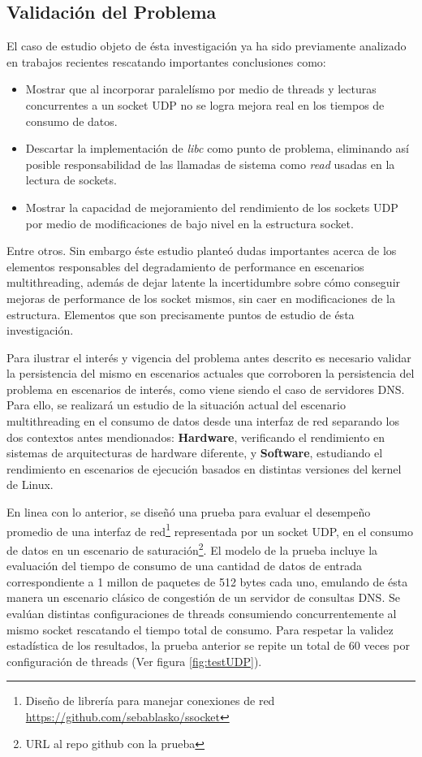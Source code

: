 \subsection{Validación del Problema}

El caso de estudio objeto de ésta investigación ya ha sido previamente analizado en trabajos recientes \cite{tesis:diegoDCC} rescatando importantes conclusiones como:
\begin{itemize}
\item Mostrar que al incorporar paralelísmo por medio de threads y lecturas concurrentes a un socket UDP no se logra mejora real en los tiempos de consumo de datos.
\item Descartar la implementación de \emph{libc} como punto de problema, eliminando así posible responsabilidad de las llamadas de sistema como \emph{read} usadas en la lectura de sockets.
\item Mostrar la capacidad de mejoramiento del rendimiento de los sockets UDP por medio de modificaciones de bajo nivel en la estructura socket.
\end{itemize}

Entre otros. Sin embargo éste estudio planteó dudas importantes acerca de los elementos responsables del degradamiento de performance en escenarios multithreading, además de dejar latente la incertidumbre sobre cómo conseguir mejoras de performance de los socket mismos, sin caer en modificaciones de la estructura. Elementos que son precisamente puntos de estudio de ésta investigación.

Para ilustrar el interés y vigencia del problema antes descrito es necesario validar la persistencia del mismo en escenarios actuales que corroboren la persistencia del problema en escenarios de interés, como viene siendo el caso de servidores DNS. Para ello, se realizará un estudio de la situación actual del escenario multithreading en el consumo de datos desde una interfaz de red separando los dos contextos antes mendionados: \textbf{Hardware}, verificando el rendimiento en sistemas de arquitecturas de hardware diferente, y \textbf{Software}, estudiando el rendimiento en escenarios de ejecución basados en distintas versiones del kernel de Linux.

En linea con lo anterior, se diseñó una prueba para evaluar el desempeño promedio de una interfaz de red\footnote{Diseño de librería para manejar conexiones de red \url{https://github.com/sebablasko/ssocket}} representada por un socket UDP, en el consumo de datos en un escenario de saturación\footnote{URL al repo github con la prueba}. El modelo de la prueba incluye la evaluación del tiempo de consumo de una cantidad de datos de entrada correspondiente a 1 millon de paquetes de 512 bytes cada uno, emulando de ésta manera un escenario clásico de congestión de un servidor de consultas DNS. Se evalúan distintas configuraciones de threads consumiendo concurrentemente al mismo socket rescatando el tiempo total de consumo. Para respetar la validez estadística de los resultados, la prueba anterior se repite un total de 60 veces por configuración de threads (Ver figura \ref{fig:testUDP}).

